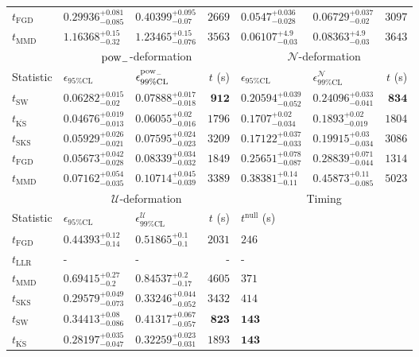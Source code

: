 \begin{tabular}{l|llr|llr}
	$t_{\mathrm{FGD}}$ & ${\mathbf{0.29936_{-0.085}^{+0.081}}}$ & ${\mathbf{0.40399_{-0.07}^{+0.095}}}$ & $2669$ & $0.0547_{-0.028}^{+0.036}$ & ${\mathbf{0.06729_{-0.02}^{+0.037}}}$ & $3097$ \\
	$t_{\mathrm{MMD}}$ & $1.16368_{-0.32}^{+0.15}$ & $1.23465_{-0.076}^{+0.15}$ & $3563$ & $0.06107_{-0.03}^{+4.9}$ & $0.08363_{-0.03}^{+4.9}$ & $3643$ \\
	\toprule
	\multicolumn{1}{c}{} & \multicolumn{3}{c}{$\rm{pow}_{-}$-deformation} & \multicolumn{3}{c}{$\mathcal{N}$-deformation} \\
	Statistic & $\epsilon_{95\%\mathrm{CL}}$ & $\epsilon^  {\rm{pow}_{-}}_{99\%\mathrm{CL}}$ & $t$ (s) & $\epsilon_{95\%\mathrm{CL}}$ & $\epsilon^    {\mathcal{N}}_{99\%\mathrm{CL}}$ & $t$ (s) \\
	\midrule
	$t_{\mathrm{SW}}$ & $0.06282_{-0.02}^{+0.015}$ & $0.07888_{-0.018}^{+0.017}$ & ${\mathbf{912}}$ & $0.20594_{-0.052}^{+0.039}$ & $0.24096_{-0.041}^{+0.033}$ & ${\mathbf{834}}$ \\
	$t_{\overline{\mathrm{KS}}}$ & ${\mathbf{0.04676_{-0.013}^{+0.019}}}$ & ${\mathbf{0.06055_{-0.016}^{+0.02}}}$ & $1796$ & ${\mathbf{0.1707_{-0.034}^{+0.02}}}$ & ${\mathbf{0.1893_{-0.019}^{+0.02}}}$ & $1804$ \\
	$t_{\mathrm{SKS}}$ & $0.05929_{-0.021}^{+0.026}$ & $0.07595_{-0.023}^{+0.024}$ & $3209$ & $0.17122_{-0.033}^{+0.037}$ & $0.19915_{-0.034}^{+0.03}$ & $3086$ \\
	$t_{\mathrm{FGD}}$ & $0.05673_{-0.028}^{+0.042}$ & $0.08339_{-0.032}^{+0.034}$ & $1849$ & $0.25651_{-0.087}^{+0.078}$ & $0.28839_{-0.044}^{+0.071}$ & $1314$ \\
	$t_{\mathrm{MMD}}$ & $0.07162_{-0.035}^{+0.054}$ & $0.10714_{-0.039}^{+0.045}$ & $3389$ & $0.38381_{-0.11}^{+0.14}$ & $0.45873_{-0.085}^{+0.11}$ & $5023$ \\
	\toprule
	\multicolumn{1}{c}{} & \multicolumn{3}{c}{$\mathcal{U}$-deformation} & \multicolumn{3}{c}{Timing} \\
	Statistic & $\epsilon_{95\%\mathrm{CL}}$ & $\epsilon^    {\mathcal{U}}_{99\%\mathrm{CL}}$ & $t$ (s) & $t^{\mathrm{null}}$ (s) \\
	\midrule
	$t_{\mathrm{FGD}}$ & $0.44393_{-0.14}^{+0.12}$ & $0.51865_{-0.1}^{+0.1}$ & $2031$ & $246$ \\
	$t_{\mathrm{LLR}}$ & - & - & - & - \\
	$t_{\mathrm{MMD}}$ & $0.69415_{-0.2}^{+0.27}$ & $0.84537_{-0.17}^{+0.2}$ & $4605$ & $371$ \\
	$t_{\mathrm{SKS}}$ & $0.29579_{-0.073}^{+0.049}$ & $0.33246_{-0.052}^{+0.044}$ & $3432$ & $414$ \\
	$t_{\mathrm{SW}}$ & $0.34413_{-0.086}^{+0.08}$ & $0.41317_{-0.057}^{+0.067}$ & ${\mathbf{823}}$ & ${\mathbf{143}}$ \\
	$t_{\overline{\mathrm{KS}}}$ & ${\mathbf{0.28197_{-0.047}^{+0.035}}}$ & ${\mathbf{0.32259_{-0.031}^{+0.023}}}$ & $1893$ & ${\mathbf{143}}$ \\
	\bottomrule
\end{tabular}